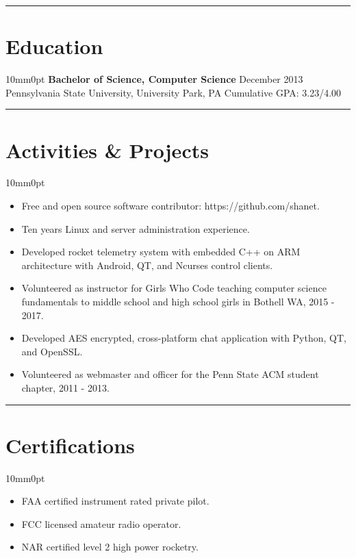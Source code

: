 \documentclass[letterpaper]{article}
\newcommand{\sectionrule}[1] {
  \noindent\rule{\textwidth}{.1mm}
  \vspace{-11mm}
  \section{#1}
}
\newenvironment{indentsection}
  {\begin{adjustwidth}{10mm}{0pt}}
  {\end{adjustwidth}}
\begin{document}
  \sectionrule{Education}

  \begin{indentsection}
    \textbf{Bachelor of Science, Computer Science} \hfill December 2013\\
    Pennsylvania State University, University Park, PA \hfill Cumulative GPA: 3.23/4.00
  \end{indentsection}

  \sectionrule{Activities \& Projects}

  \begin{indentsection}
    \begin{itemize}
      \item Free and open source software contributor: https://github.com/shanet.
      \item Ten years Linux and server administration experience.
      \item Developed rocket telemetry system with embedded C++ on ARM architecture with Android, QT, and Ncurses control clients.
      \item Volunteered as instructor for Girls Who Code teaching computer science fundamentals to middle school and high school girls in Bothell WA, 2015 - 2017.
      \item Developed AES encrypted, cross-platform chat application with Python, QT, and OpenSSL.
      \item Volunteered as webmaster and officer for the Penn State ACM student chapter, 2011 - 2013.
    \end{itemize}
  \end{indentsection}

  \sectionrule{Certifications}

  \begin{indentsection}
    \begin{itemize}
      \item FAA certified instrument rated private pilot.
      \item FCC licensed amateur radio operator.
      \item NAR certified level 2 high power rocketry.
    \end{itemize}
  \end{indentsection}
\end{document}
